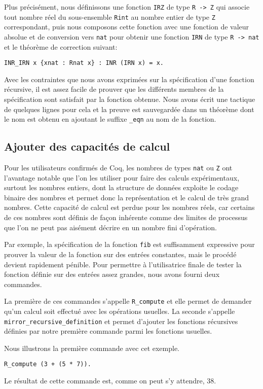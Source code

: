 \documentclass[draft]{jflart}
\begin{document}
Plus précisément, nous définissons une fonction \texttt{IRZ} de type
\texttt{R -> Z} qui associe tout nombre réel du sous-ensemble \texttt{Rint}
au nombre entier de type \texttt{Z} correspondant, puis nous composons
cette fonction avec une fonction de valeur absolue et de conversion
vers \texttt{nat} pour obtenir une fonction \texttt{IRN} de type \texttt{R ->
  nat} et le théorème de correction suivant:
\begin{verbatim}
INR_IRN x {xnat : Rnat x} : INR (IRN x) = x.
\end{verbatim}

Avec les contraintes que nous avons exprimées sur la spécification
d'une fonction récursive, il est assez facile de prouver que les
différents membres de la spécification sont satisfait par la fonction
obtenue.  Nous avons écrit une tactique de quelques lignes pour cela
et la preuve est sauvegardée dans un théorème dont le nom est obtenu
en ajoutant le suffixe \texttt{\_eqn} au nom de la fonction.

\subsection{Ajouter des capacités de calcul}
Pour les utilisateurs confirmés de Coq, les nombres de types \texttt{nat} ou
\texttt{Z} ont l'avantage notable que l'on les utiliser pour faire des calculs
expérimentaux, surtout les nombres entiers, dont la structure de données
exploite le codage binaire des nombres et permet donc la représentation
et le calcul de très grand nombres.  Cette capacité de calcul est perdue pour
les nombres réels, car certains de ces nombres sont définis de façon inhérente
comme des limites de processus que l'on ne peut pas aisément décrire en
un nombre fini d'opération.

Par exemple, la spécification de la fonction \texttt{fib} est
suffisamment expressive pour prouver la valeur de la fonction sur des
entrées constantes, mais le procédé devient rapidement pénible.  Pour
permettre à l'utilisatrice finale de tester la fonction définie sur des
entrées assez grandes, nous avons fourni deux commandes.

La première de ces commandes s'appelle \texttt{R\_compute} et elle
permet de demander qu'un calcul soit effectué avec les opérations
usuelles.  La seconde s'appelle \texttt{mirror\_recursive\_definition}
et permet d'ajouter les fonctions récursives définies par notre
première commande parmi les fonctions usuelles.

Nous illustrons la première commande avec cet exemple.
\begin{verbatim}
R_compute (3 + (5 * 7)).
\end{verbatim}
Le résultat de cette commande est, comme on peut s'y attendre, 38.
\end{document}
